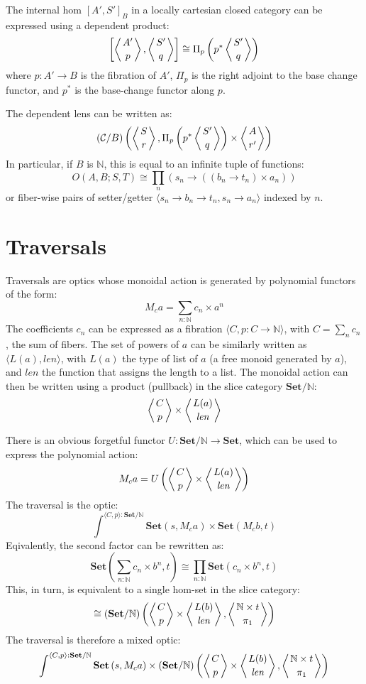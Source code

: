 \documentclass[11pt]{amsart}
\begin{document}
The internal hom $[A', S']_B$ in a locally cartesian closed category can be expressed using a dependent product:
\[ \left [\left \langle A' \atop p \right \rangle, \left \langle S' \atop q \right \rangle \right ] \cong \Pi_p \left(p^* \left \langle S' \atop q \right \rangle \right)\]
where $p \colon A' \to B$ is the fibration of $A'$, $\Pi_p$ is the right adjoint to the base change functor, and $p^*$ is the base-change functor along $p$.

The dependent lens can be written as:
\[ (\mathcal{C} / B) \left( \left \langle S \atop r \right \rangle, \Pi_p \left(p^* \left \langle S' \atop q \right \rangle \right) \times \left \langle A \atop r' \right \rangle \right) \]
In particular, if $B$ is $\mathbb{N}$, this is equal to an infinite tuple of functions:
\[O(A, B; S, T) \cong \prod_n \left( s_n \to \left((b_n \to t_n) \times a_n \right) \right) \]
or fiber-wise pairs of setter/getter $\langle s_n \to b_n \to t_n, s_n \to a_n \rangle$ indexed by $n$.

\section{Traversals}

Traversals are optics whose monoidal action is generated by polynomial functors of the form:
\[ M_{c} a = \sum_{n \colon \mathbb{N}} c_n \times a^n \]
The coefficients $c_n$ can be expressed as a fibration $ \langle C, p \colon C \to \mathbb{N} \rangle$, with $C = \sum_n c_n$, the sum of fibers. The set of powers of $a$ can be similarly written as $\langle L(a), \mathit{len} \rangle$, with $L(a)$ the type of list of $a$ (a free monoid generated by $a$), and $\mathit{len}$ the function that assigns the length to a list. The monoidal action can then be written using a product (pullback) in the slice category $\mathbf{Set}/\mathbb{N}$:
\[ \left \langle {C \atop p} \right \rangle \times \left \langle {L(a) \atop \mathit{len}} \right \rangle \]

There is an obvious forgetful functor $U \colon \mathbf{Set}/\mathbb{N} \to \mathbf{Set}$, which can be used to express the polynomial action:
\[ M_c a = U\left( 
  \left \langle {C \atop p} \right \rangle \times \left \langle {L(a) \atop \mathit{len}} \right \rangle \right) \]
The traversal is the optic:
\[ \int^{\langle C, p \rangle : \mathbf{Set}/\mathbb{N}} \mathbf{Set} 
\left(s, M_c a \right)  
  \times \mathbf{Set}(M_c b, t) \]
Eqivalently, the second factor can be rewritten as:
\[  \mathbf{Set}\left( \sum_{n \colon \mathbb{N}} c_n \times b^n, t\right) \cong \prod_{n \colon  \mathbb{N}}  \mathbf{Set}(c_n \times b^n, t)\]
This, in turn, is equivalent to a single hom-set in the slice category:
\[ 
 \cong  
(\mathbf{Set}/\mathbb{N})\left(\left \langle {C \atop p} \right \rangle \times \left \langle {L(b) \atop \mathit{len}} \right \rangle, \left \langle {\mathbb{N} \times t \atop \pi_1} \right \rangle \right) \]
The traversal is therefore a mixed optic:
\[ \int^{\langle C, p \rangle : \mathbf{Set}/\mathbb{N}} \mathbf{Set} 
\left(s,  M_c a \right)  
  \times (\mathbf{Set}/\mathbb{N})\left( \left \langle {C \atop p} \right \rangle 
  \times \left \langle {L(b) \atop \mathit{len}} \right \rangle, \left \langle {\mathbb{N} \times t \atop \pi_1} \right \rangle \right) \]
\end{document}
